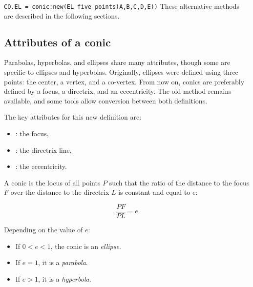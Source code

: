 \verb|CO.EL = conic:new(EL_five_points(A,B,C,D,E))|
These alternative methods are described in the following sections.



\subsection{Attributes of a conic}

Parabolas, hyperbolas, and ellipses share many attributes, though some are specific to ellipses and hyperbolas. Originally, ellipses were defined using three points: the center, a vertex, and a co-vertex. From now on, conics are preferably defined by a focus, a directrix, and an eccentricity. The old method remains available, and some tools allow conversion between both definitions.

\vspace{1em}

The key attributes for this new definition are:
\begin{itemize}
  \item {}: the focus,
  \item {}: the directrix line,
  \item {}: the eccentricity.
\end{itemize}

\vspace{1em}

A conic is the locus of all points $P$ such that the ratio of the distance to the focus $F$ over the distance to the directrix $L$ is constant and equal to $e$:

\[
\frac{PF}{PL} = e
\]

Depending on the value of $e$:
\begin{itemize}
  \item If $0 < e < 1$, the conic is an \emph{ellipse}.
  \item If $e = 1$, it is a \emph{parabola}.
  \item If $e > 1$, it is a \emph{hyperbola}.
\end{itemize}

